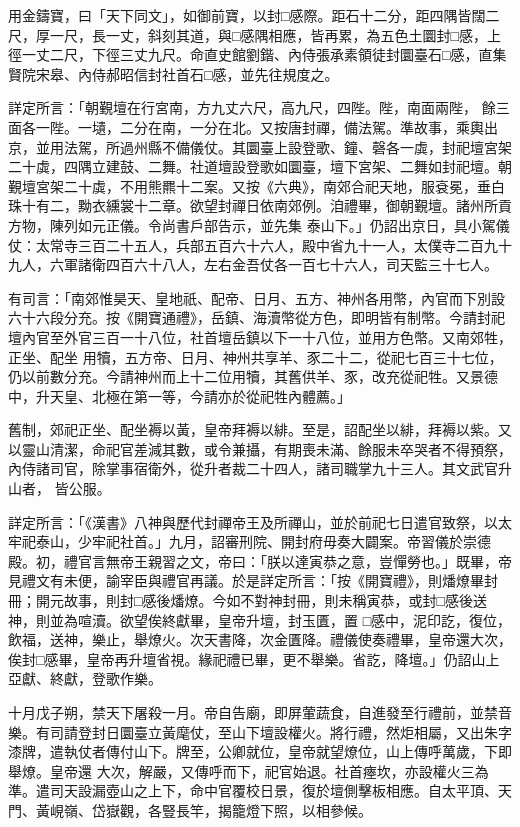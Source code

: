 \begin{pinyinscope}
 用金鑄寶，曰「天下同文」，如御前寶，以封□感際。距石十二分，距四隅皆闊二尺，厚一尺，長一丈，斜刻其道，與□感隅相應，皆再累，為五色土圜封□感，上徑一丈二尺，下徑三丈九尺。命直史館劉鍇、內侍張承素領徒封圜臺石□感，直集賢院宋皋、內侍郝昭信封社首石□感，並先往規度之。



 詳定所言：「朝覲壇在行宮南，方九丈六尺，高九尺，四陛。陛，南面兩陛，
 餘三面各一陛。一壝，二分在南，一分在北。又按唐封禪，備法駕。準故事，乘輿出京，並用法駕，所過州縣不備儀仗。其圜臺上設登歌、鐘、磬各一虡，封祀壇宮架二十虡，四隅立建鼓、二舞。社道壇設登歌如圜臺，壇下宮架、二舞如封祀壇。朝覲壇宮架二十虡，不用熊羆十二案。又按《六典》，南郊合祀天地，服袞冕，垂白珠十有二，黝衣纁裳十二章。欲望封禪日依南郊例。洎禮畢，御朝覲壇。諸州所貢方物，陳列如元正儀。令尚書戶部告示，並先集
 泰山下。」仍詔出京日，具小駕儀仗：太常寺三百二十五人，兵部五百六十六人，殿中省九十一人，太僕寺二百九十九人，六軍諸衛四百六十八人，左右金吾仗各一百七十六人，司天監三十七人。



 有司言：「南郊惟昊天、皇地祇、配帝、日月、五方、神州各用幣，內官而下別設六十六段分充。按《開寶通禮》，岳鎮、海瀆幣從方色，即明皆有制幣。今請封祀壇內官至外官三百一十八位，社首壇岳鎮以下一十八位，並用方色幣。又南郊牲，正坐、配坐
 用犢，五方帝、日月、神州共享羊、豕二十二，從祀七百三十七位，仍以前數分充。今請神州而上十二位用犢，其舊供羊、豕，改充從祀牲。又景德中，升天皇、北極在第一等，今請亦於從祀牲內體薦。」



 舊制，郊祀正坐、配坐褥以黃，皇帝拜褥以緋。至是，詔配坐以緋，拜褥以紫。又以靈山清潔，命祀官差減其數，或令兼攝，有期喪未滿、餘服未卒哭者不得預祭，內侍諸司官，除掌事宿衛外，從升者裁二十四人，諸司職掌九十三人。其文武官升山者，
 皆公服。



 詳定所言：「《漢書》八神與歷代封禪帝王及所禪山，並於前祀七日遣官致祭，以太牢祀泰山，少牢祀社首。」九月，詔審刑院、開封府毋奏大闢案。帝習儀於崇德殿。初，禮官言無帝王親習之文，帝曰：「朕以達寅恭之意，豈憚勞也。」既畢，帝見禮文有未便，諭宰臣與禮官再議。於是詳定所言：「按《開寶禮》，則燔燎畢封冊；開元故事，則封□感後燔燎。今如不對神封冊，則未稱寅恭，或封□感後送神，則並為喧瀆。欲望俟終獻畢，皇帝升壇，封玉匱，置
 □感中，泥印訖，復位，飲福，送神，樂止，舉燎火。次天書降，次金匱降。禮儀使奏禮畢，皇帝還大次，俟封□感畢，皇帝再升壇省視。緣祀禮已畢，更不舉樂。省訖，降壇。」仍詔山上亞獻、終獻，登歌作樂。



 十月戊子朔，禁天下屠殺一月。帝自告廟，即屏葷蔬食，自進發至行禮前，並禁音樂。有司請登封日圜臺立黃麾仗，至山下壇設權火。將行禮，然炬相屬，又出朱字漆牌，遣執仗者傳付山下。牌至，公卿就位，皇帝就望燎位，山上傳呼萬歲，下即舉燎。皇帝還
 大次，解嚴，又傳呼而下，祀官始退。社首瘞坎，亦設權火三為準。遣司天設漏壺山之上下，命中官覆校日景，復於壇側擊板相應。自太平頂、天門、黃峴嶺、岱嶽觀，各豎長竿，揭籠燈下照，以相參候。




\end{pinyinscope}
